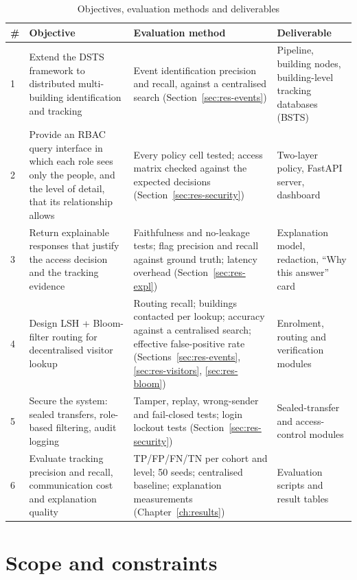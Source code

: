 \documentclass[12pt,a4paper,oneside]{report}
\begin{document}
\begin{table}[htbp]
\centering
\caption{Objectives, evaluation methods and deliverables}\label{tab:objectives}
{\small\setlength{\tabcolsep}{4pt}\renewcommand{\arraystretch}{1.2}
\begin{tabular}{|p{0.6cm}|p{4.4cm}|p{5.2cm}|p{3.6cm}|}\hline
\textbf{\#} & \textbf{Objective} & \textbf{Evaluation method} & \textbf{Deliverable}\\\hline
1 & Extend the DSTS framework to distributed multi-building identification and tracking & Event identification precision and recall, against a centralised search (Section~\ref{sec:res-events}) & Pipeline, building nodes, building-level tracking databases (BSTS)\\\hline
2 & Provide an RBAC query interface in which each role sees only the people, and the level of detail, that its relationship allows & Every policy cell tested; access matrix checked against the expected decisions (Section~\ref{sec:res-security}) & Two-layer policy, FastAPI server, dashboard\\\hline
3 & Return explainable responses that justify the access decision and the tracking evidence & Faithfulness and no-leakage tests; flag precision and recall against ground truth; latency overhead (Section~\ref{sec:res-expl}) & Explanation model, redaction, ``Why this answer'' card\\\hline
4 & Design LSH + Bloom-filter routing for decentralised visitor lookup & Routing recall; buildings contacted per lookup; accuracy against a centralised search; effective false-positive rate (Sections~\ref{sec:res-events}, \ref{sec:res-visitors}, \ref{sec:res-bloom}) & Enrolment, routing and verification modules\\\hline
5 & Secure the system: sealed transfers, role-based filtering, audit logging & Tamper, replay, wrong-sender and fail-closed tests; login lockout tests (Section~\ref{sec:res-security}) & Sealed-transfer and access-control modules\\\hline
6 & Evaluate tracking precision and recall, communication cost and explanation quality & TP/FP/FN/TN per cohort and level; 50 seeds; centralised baseline; explanation measurements (Chapter~\ref{ch:results}) & Evaluation scripts and result tables\\\hline
\end{tabular}}
\end{table}

\section{Scope and constraints}
\end{document}
